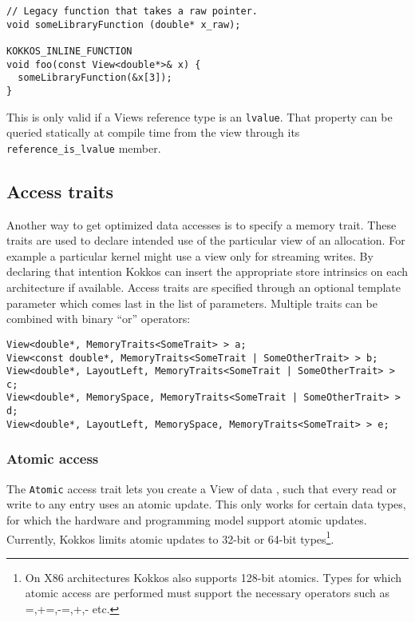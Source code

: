\begin{lstlisting}
// Legacy function that takes a raw pointer.
void someLibraryFunction (double* x_raw);

KOKKOS_INLINE_FUNCTION
void foo(const View<double*>& x) {
  someLibraryFunction(&x[3]);
}
\end{lstlisting}

This is only valid if a Views reference type is an \lstinline|lvalue|.
That property can be queried statically at compile time from the view through
its \lstinline|reference_is_lvalue| member. 



\subsection{Access traits}\label{S:View:AccessTraits}


Another way to get optimized data accesses is to specify a memory trait. 
These traits are used to declare intended use of the particular view of 
an allocation. For example a particular kernel might use a view only for 
streaming writes. By declaring that intention Kokkos can insert the 
appropriate store intrinsics on each architecture if available. Access traits
are specified through an optional template parameter which comes last in the list
of parameters. Multiple traits can be combined with binary ``or'' operators: 

\begin{lstlisting}
View<double*, MemoryTraits<SomeTrait> > a;
View<const double*, MemoryTraits<SomeTrait | SomeOtherTrait> > b;
View<double*, LayoutLeft, MemoryTraits<SomeTrait | SomeOtherTrait> > c;
View<double*, MemorySpace, MemoryTraits<SomeTrait | SomeOtherTrait> > d;
View<double*, LayoutLeft, MemorySpace, MemoryTraits<SomeTrait> > e;
\end{lstlisting}

\subsubsection{Atomic access}

The \lstinline!Atomic! access trait lets you create a View of data , such that every
read or write to any entry uses an atomic update.  This only works for
certain data types, for which the hardware and programming model
support atomic updates.  Currently, Kokkos limits atomic updates to
32-bit or 64-bit types\footnote{On X86 architectures Kokkos also supports 
128-bit atomics. Types for which atomic access are performed must support the 
necessary operators such as =,+=,-=,+,- etc.}.

